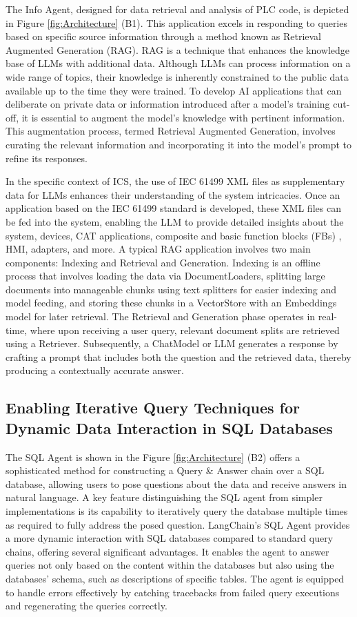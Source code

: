 \begin{bibunit}
The Info Agent, designed for data retrieval and analysis of PLC code, is depicted in Figure \ref{fig:Architecture} (B1). This application excels in responding to queries based on specific source information through a method known as Retrieval Augmented Generation (RAG). RAG is a technique that enhances the knowledge base of LLMs with additional data. Although LLMs can process information on a wide range of topics, their knowledge is inherently constrained to the public data available up to the time they were trained. To develop AI applications that can deliberate on private data or information introduced after a model's training cut-off, it is essential to augment the model's knowledge with pertinent information. This augmentation process, termed Retrieval Augmented Generation, involves curating the relevant information and incorporating it into the model's prompt to refine its responses.

In the specific context of ICS, the use of IEC 61499 XML files as supplementary data for LLMs enhances their understanding of the system intricacies. Once an application based on the IEC 61499 standard is developed, these XML files can be fed into the system, enabling the LLM to provide detailed insights about the system, devices, CAT applications, composite and basic function blocks (FBs) , HMI, adapters, and more. A typical RAG application involves two main components: Indexing and Retrieval and Generation. Indexing is an offline process that involves loading the data via DocumentLoaders, splitting large documents into manageable chunks using text splitters for easier indexing and model feeding, and storing these chunks in a VectorStore with an Embeddings model for later retrieval. The Retrieval and Generation phase operates in real-time, where upon receiving a user query, relevant document splits are retrieved using a Retriever. Subsequently, a ChatModel or LLM generates a response by crafting a prompt that includes both the question and the retrieved data, thereby producing a contextually accurate answer.


\subsection{Enabling Iterative Query Techniques  for Dynamic Data Interaction in SQL Databases} 

The SQL Agent is shown in the Figure \ref{fig:Architecture} (B2) offers a sophisticated method for constructing a Query \& Answer chain over a SQL database, allowing users to pose questions about the data and receive answers in natural language. A key feature distinguishing the SQL agent from simpler implementations is its capability to iteratively query the database multiple times as required to fully address the posed question. LangChain's SQL Agent provides a more dynamic interaction with SQL databases compared to standard query chains, offering several significant advantages. It enables the agent to answer queries not only based on the content within the databases but also using the databases’ schema, such as descriptions of specific tables. The agent is equipped to handle errors effectively by catching tracebacks from failed query executions and regenerating the queries correctly. 


\end{bibunit}
